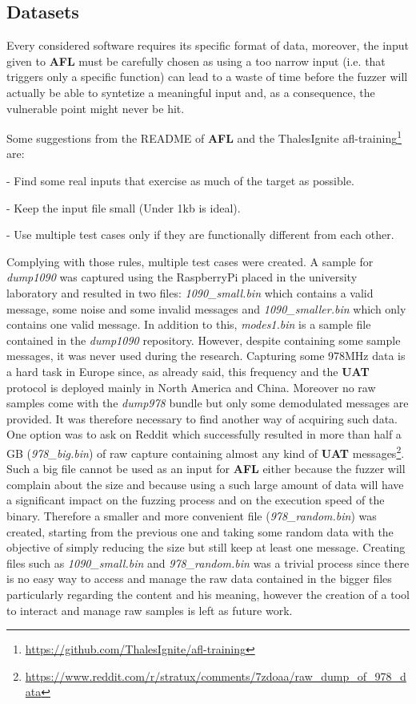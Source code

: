 \documentclass[../main.tex]{subfiles}
\begin{document}
\subsection{Datasets}

Every considered software requires its specific format of data, moreover, the
input given to \textbf{AFL} must be carefully chosen as using a too narrow input
(i.e. that triggers only a specific function) can lead to a waste of time before
the fuzzer will actually be able to syntetize a meaningful input and, as a consequence, the vulnerable point might never be hit.

Some suggestions from the README of \textbf{AFL} and the ThalesIgnite afl-training\footnote{\url{https://github.com/ThalesIgnite/afl-training}} are:

- Find some real inputs that exercise as much of the target as possible.

- Keep the input file small (Under 1kb  is ideal).

- Use multiple test cases only if they are functionally different from each
other.

\bigskip Complying with those rules, multiple test cases were created. A sample
for \textit{dump1090} was captured using the RaspberryPi placed in the
university laboratory and resulted in two files:  \emph{1090\_small.bin} which
contains a valid message, some noise and some invalid messages and
\emph{1090\_smaller.bin} which only contains one valid message. In addition to
this, \emph{modes1.bin} is a sample file contained in the \emph{dump1090}
repository. However, despite containing some sample messages, it was never used
during the research. Capturing some 978MHz data is a hard task in Europe since,
as already said, this frequency and the \textbf{UAT} protocol is deployed mainly
in North America and China. Moreover no raw samples come with the
\textit{dump978} bundle but only some demodulated messages are provided. It was
therefore necessary to find another way of acquiring such data. One option was
to ask on Reddit which successfully resulted in more than half a GB
(\textit{978\_big.bin}) of raw capture containing almost any kind of
\textbf{UAT}
messages\footnote{\url{https://www.reddit.com/r/stratux/comments/7zdoaa/raw_dump_of_978_data}}.
Such a big file cannot be used as an input for \textbf{AFL} either because the
fuzzer will complain about the size and because using a such large amount of
data will have a significant impact on the fuzzing process and on the execution
speed of the binary. Therefore a smaller and more convenient file
(\textit{978\_random.bin}) was created, starting from the previous one and
taking some random data with the objective of simply reducing the size but still
keep at least one message. Creating files such as \textit{1090\_small.bin} and
\textit{978\_random.bin} was a trivial process since there is no easy way to
access and manage the raw data contained in the bigger files particularly
regarding the content and his meaning, however the creation of a tool to
interact and manage raw samples is left as future work.
\end{document}
